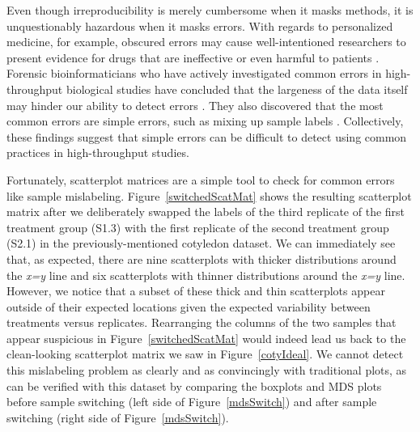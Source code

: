\documentclass{bioinfo}
\begin{document}
Even though irreproducibility is merely cumbersome when it masks methods, it is unquestionably hazardous when it masks errors. With regards to personalized medicine, for example, obscured errors may cause well-intentioned researchers to present evidence for drugs that are ineffective or even harmful to patients \citep{Baggerly}. Forensic bioinformaticians who have actively investigated common errors in high-throughput biological studies have concluded that the largeness of the data itself may hinder our ability to detect errors \citep{Baggerly}. They also discovered that the most common errors are simple errors, such as mixing up sample labels \citep{Baggerly}. Collectively, these findings suggest that simple errors can be difficult to detect using common practices in high-throughput studies.

Fortunately, scatterplot matrices are a simple tool to check for common errors like sample mislabeling. Figure~\ref{switchedScatMat} shows the resulting scatterplot matrix after we deliberately swapped the labels of the third replicate of the first treatment group (S1.3) with the first replicate of the second treatment group (S2.1) in the previously-mentioned cotyledon dataset. We can immediately see that, as expected, there are nine scatterplots with thicker distributions around the \textit{x=y} line and six scatterplots with thinner distributions around the \textit{x=y} line. However, we notice that a subset of these thick and thin scatterplots appear outside of their expected locations given the expected variability between treatments versus replicates. Rearranging the columns of the two samples that appear suspicious in Figure~\ref{switchedScatMat} would indeed lead us back to the clean-looking scatterplot matrix we saw in Figure~\ref{cotyIdeal}. We cannot detect this mislabeling problem as clearly and as convincingly with traditional plots, as can be verified with this dataset by comparing the boxplots and MDS plots before sample switching (left side of Figure~\ref{mdsSwitch}) and after sample switching (right side of Figure~\ref{mdsSwitch}). 
\end{document}
